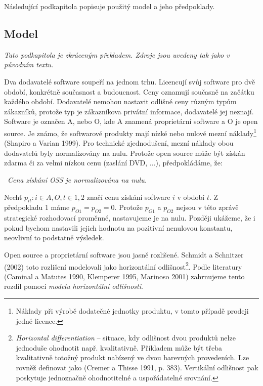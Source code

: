\begin{multicols}{2}
	Následující podkapitola popisuje použitý model a jeho předpoklady.

	\subsection*{Model}
	{\em Tato podkapitola je zkráceným překladem. Zdroje jsou uvedeny tak jako v původním textu.}

	Dva dodavatelé software soupeří na jednom trhu. Licencují svůj software pro dvě období, konkrétně současnost a budoucnost. Ceny oznamují současně na začátku každého období. Dodavatelé nemohou nastavit odlišné ceny různým typům zákazníků, protože typ je zákazníkova privátní informace, dodavatelé jej neznají. Software je označen A, nebo O, kde A znamená proprietární software a O je open source. Je známo, že softwarové produkty mají nízké nebo nulové mezní náklady\footnote{Náklady při výrobě dodatečné jednotky produktu, v tomto případě prodeji jedné licence.} (Shapiro a Varian 1999). Pro technické zjednodušení, mezní náklady obou dodavatelů byly normalizovány na nulu. Protože open source může být získán zdarma či za velmi nízkou cenu (zaslání DVD, ...), předpokládáme, že:

	\vspace{10pt}
	~{\em Cena získání OSS je normalizována na nulu.}
	\vspace{10pt}

	Nechť $p_{it}: i \in {A,O}, t \in {1,2}$ značí cenu získání software $i$ v období $t$. Z předpokladu 1 máme $p_{O1} = p_{O2} = 0$. Protože $p_{O1}$ a $p_{O2}$ nejsou v této zprávě strategické rozhodovací proměnné, nastavujeme je na nulu. Později ukážeme, že i pokud bychom nastavili jejich hodnotu na pozitivní nenulovou konstantu, neovlivní to podstatně výsledek.

	Open source a proprietární software jsou jasně rozlišené. Schmidt a Schnitzer (2002) toto rozlišení modelovali jako horizontální odlišnost\footnote{{\em Horizontal differentiation} -- situace, kdy odlišnost dvou produktů nelze jednoduše ohodnotit např. kvalitativně. Příkladem může být třeba kvalitativně totožný produkt nabízený ve dvou barevných provedeních. Lze rovněž definovat jako {\em{}} (Cremer a Thisse 1991, p. 383). Vertikální odlišnost pak poskytuje jednoznačně ohodnotitelné a uspořádatelné srovnání.}. Podle literatury (Caminal a Matutes 1990, Klemperer 1995, Marinoso 2001) zahrnujeme tento rozdíl pomocí {\em modelu horizontální odlišnosti}.


\end{multicols}
